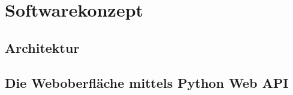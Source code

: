 \chapter{Softwarekonzept} \label{chap:softwarekonzept}

\section{Architektur} \label{sec:architektur}

\section{Die Weboberfläche mittels Python Web API} \label{sec:weboberflaeche}